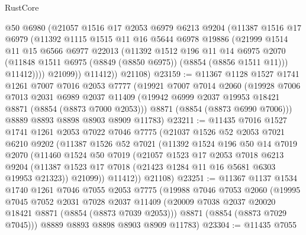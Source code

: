 \begin{lexlean}{RustCore}
\begin{coremodule}
            @50
            @6980
            (@21057
              @1516
              @17
              @2053
              @6979
              @6213
              @9204
              (@11387
                @1516
                @17
                @6979
                (@11392
                  @1115
                  @1515
                  @11
                  @16
                  @5644
                  @6978
                  @19886
                  (@21999
                    @1514
                    @11
                    @15
                    @6566
                    @6977
                    @22013
                    (@11392
                      @1512
                      @196
                      @11
                      @14
                      @6975
                      @2070
                      (@11848 @1511 @6975 (@8849 (@8850 @6975)) (@8854 (@8856 @1511 @11)))
                      @11412))))
              @21099))
          @11412))
      @21108)
@23159 := @11367
    @1128
    @1527
    @1741
    @1261
    @7007
    @7016
    @2053
    @7777
    (@19921
      @7007
      @7014
      @2060
      (@19928
        @7006
        @7013
        @2031
        @6989
        @2037
        @11409
        (@19942 @6999 @2037 @19953 @18421 @8871 (@8854 (@8873 @7000 @2053)))
        @8871
        (@8854 (@8873 @6990 @7006)))
      @8889
      @8893
      @8898
      @8903
      @8909
      @11783)
@23211 := @11435
    @7016
    @1527
    @1741
    @1261
    @2053
    @7022
    @7046
    @7775
    (@21037
      @1526
      @52
      @2053
      @7021
      @6210
      @9202
      (@11387
        @1526
        @52
        @7021
        (@11392
          @1524
          @196
          @50
          @14
          @7019
          @2070
          (@11460
            @1524
            @50
            @7019
            (@21057
              @1523
              @17
              @2053
              @7018
              @6213
              @9204
              (@11387 @1523 @17 @7018 (@21423 @1284 @11 @16 @5681 @6303 @19953 @21323))
              @21099))
          @11412))
      @21108)
@23251 := @11367
    @1137
    @1534
    @1740
    @1261
    @7046
    @7055
    @2053
    @7775
    (@19988
      @7046
      @7053
      @2060
      (@19995
        @7045
        @7052
        @2031
        @7028
        @2037
        @11409
        (@20009 @7038 @2037 @20020 @18421 @8871 (@8854 (@8873 @7039 @2053)))
        @8871
        (@8854 (@8873 @7029 @7045)))
      @8889
      @8893
      @8898
      @8903
      @8909
      @11783)
@23304 := @11435
    @7055

\end{coremodule}
\end{lexlean}
